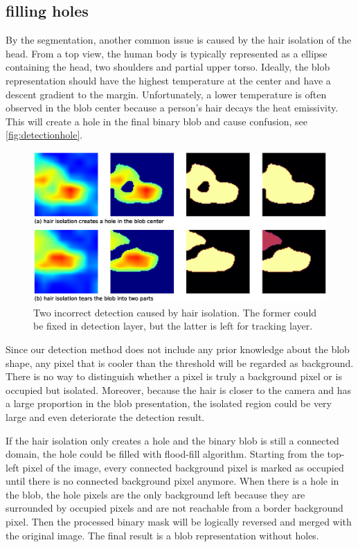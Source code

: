 \subsection{filling holes}
By the segmentation, another common issue is caused by the hair isolation of the head. From a top view, the human body is typically represented as a ellipse containing the head, two shoulders and partial upper torso. Ideally, the blob representation should have the highest temperature at the center and have a descent gradient to the margin. Unfortunately, a lower temperature is often observed in the blob center because a person's hair decays the heat emissivity. This will create a hole in the final binary blob and cause confusion, see \autoref{fig:detectionhole}.
\begin{figure}
  \centering
  \includegraphics[width=\textwidth]{figures/detect_hole.eps}
  \caption{Two incorrect detection caused by hair isolation. The former could be fixed in detection layer, but the latter is left for tracking layer.}\label{fig:detectionhole}
\end{figure}

Since our detection method does not include any prior knowledge about the blob shape, any pixel that is cooler than the threshold will be regarded as background. There is no way to distinguish whether a pixel is truly a background pixel or is occupied but isolated. Moreover, because the hair is closer to the camera and has a large proportion in the blob presentation, the isolated region could be very large and even deteriorate the detection result.

If the hair isolation only creates a hole and the binary blob is still a connected domain, the hole could be filled with flood-fill algorithm. Starting from the top-left pixel of the image, every connected background pixel is marked as occupied until there is no connected background pixel anymore. When there is a hole in the blob, the hole pixels are the only background left because they are surrounded by occupied pixels and are not reachable from a border background pixel. Then the processed binary mask will be logically reversed and merged with the original image. The final result is a blob representation without holes.

